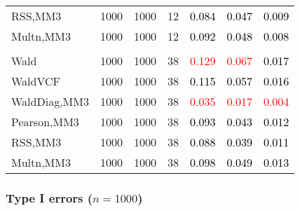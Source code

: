 \documentclass[
]{article}
\begin{document}
\begin{table}[H]
{\begin{tabular}[t]{lrrrrrr}
\hspace{1em}RSS,MM3 & 1000 & 1000 & 12 & \textcolor{black}{0.084} & \textcolor{black}{0.047} & \textcolor{black}{0.009}\\
\hspace{1em}Multn,MM3 & 1000 & 1000 & 12 & \textcolor{black}{0.092} & \textcolor{black}{0.048} & \textcolor{black}{0.008}\\
\addlinespace[0.3em]
\multicolumn{7}{l}{\textbf{3F 15V}}\\
\hspace{1em}Wald & 1000 & 1000 & 38 & \textcolor{red}{0.129} & \textcolor{red}{0.067} & \textcolor{black}{0.017}\\
\hspace{1em}WaldVCF & 1000 & 1000 & 38 & \textcolor{black}{0.115} & \textcolor{black}{0.057} & \textcolor{black}{0.016}\\
\hspace{1em}WaldDiag,MM3 & 1000 & 1000 & 38 & \textcolor{red}{0.035} & \textcolor{red}{0.017} & \textcolor{red}{0.004}\\
\hspace{1em}Pearson,MM3 & 1000 & 1000 & 38 & \textcolor{black}{0.093} & \textcolor{black}{0.043} & \textcolor{black}{0.012}\\
\hspace{1em}RSS,MM3 & 1000 & 1000 & 38 & \textcolor{black}{0.088} & \textcolor{black}{0.039} & \textcolor{black}{0.011}\\
\hspace{1em}Multn,MM3 & 1000 & 1000 & 38 & \textcolor{black}{0.098} & \textcolor{black}{0.049} & \textcolor{black}{0.013}\\
\bottomrule
\end{tabular}}
\endgroup{}
\end{table}

\subsubsection{\texorpdfstring{Type I errors
(\(n=1000\))}{Type I errors (n=1000)}}\label{type-i-errors-n1000-1}
\end{document}
